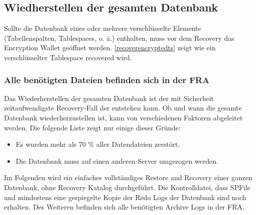     \subsection{Wiedherstellen der gesamten Datenbank}
      \begin{merke}
        Sollte die Datenbank eines oder mehrere verschl\"usselte Elemente (Tabellenspalten, Tablespaces, o. \"a.) enthalten, muss vor dem Recovery das Encryption Wallet ge\"offnet werden. \ref{recoverencryptedts} zeigt wie ein verschl\"usselter Tablespace recovered wird.
      \end{merke}
\clearpage
      \subsubsection{Alle ben\"otigten Dateien befinden sich in der FRA}
        Das Wiederherstellen der gesamten Datenbank ist der mit Sicherheit zeitaufwendigste Recovery-Fall der entstehen kann. Ob und wann die gesamte Datenbank wiederherzustellen ist, kann von verschiedenen Faktoren abgeleitet werden. Die folgende Liste zeigt nur einige dieser Gr\"unde:
        \begin{itemize}
          \item Es wurden mehr als 70 \% aller Datendateien zerst\"ort.
          \item Die Datenbank muss auf einen anderen Server umgezogen werden.
        \end{itemize}
        Im Folgenden wird ein einfaches vollst\"andiges Restore and Recovery einer ganzen Datenbank, ohne Recovery Katalog durchgef\"uhrt. Die Kontrolldatei, dass SPFile und mindestens eine gespiegelte Kopie der Redo Logs der Datenbank sind noch erhalten. Des Weiteren befinden sich alle ben\"otigten Archive Logs in der FRA.
